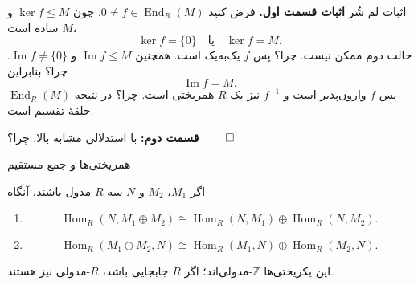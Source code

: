 \begin{frame}[t]{اثبات لم شُر}
    \label{lec07:schur-proof}
    \textbf{اثبات قسمت اول.} فرض کنید \(0\ne f\in\operatorname{End}_R(M)\).
    چون \(\ker f\leqslant M\) و \(M\) ساده است،
    \[
        \ker f=\{0\}\quad\text{یا}\quad\ker f=M.
    \]
    حالت دوم ممکن نیست. \alert{چرا؟} پس \(f\) یک‌به‌یک است.
    همچنین \(\operatorname{Im}f\leqslant M\) و \(\operatorname{Im}f\ne\{0\}\). \alert{چرا؟} بنابراین
    \[
        \operatorname{Im}f=M.
    \]
    پس \(f\) وارون‌پذیر است و \(f^{-1}\) نیز یک \(R\)-همریختی است. \alert{چرا؟}
    در نتیجه \(\operatorname{End}_R(M)\) حلقهٔ تقسیم است.
    \medskip

    \textbf{قسمت دوم:} با استدلالی مشابه بالا. \alert{چرا؟}
    \hfill\(\qed\)
\end{frame}

\begin{frame}[t]{همریختی‌ها و جمع مستقیم}
    \label{lec07:hom-finite-sums}
    \begin{theorem}
        اگر \(M_1\)، \(M_2\) و \(N\) سه \(R\)-مدول باشند، آنگاه
        \begin{enumerate}
            \item
            \[
                \operatorname{Hom}_R(N,M_1\oplus M_2)
                \cong\operatorname{Hom}_R(N,M_1)\oplus\operatorname{Hom}_R(N,M_2).
            \]
            \item
            \[
                \operatorname{Hom}_R(M_1\oplus M_2,N)
                \cong\operatorname{Hom}_R(M_1,N)\oplus\operatorname{Hom}_R(M_2,N).
            \]
        \end{enumerate}
        این یکریختی‌ها \(\mathbb Z\)-مدولی‌اند؛ اگر \(R\) جابجایی باشد، \(R\)-مدولی نیز هستند.
    \end{theorem}
\end{frame}

